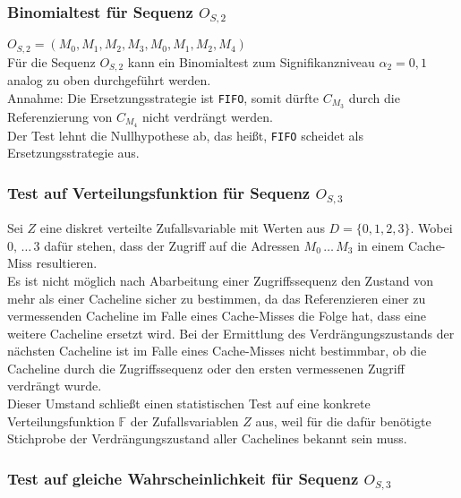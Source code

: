 \documentclass[]{scrbook}
\begin{document}
\subsubsection{Binomialtest für Sequenz $O_{S,2}$}

$O_{S,2} = (M_0 , M_1 , M_2 , M_3 , M_0 , M_1 , M_2 , M_4 )$
\\
Für die Sequenz $O_{S,2}$ kann ein Binomialtest zum Signifikanzniveau $\alpha_2 = 0,1$ analog zu oben durchgeführt werden.
\\
Annahme: Die Ersetzungsstrategie ist \texttt{FIFO}, somit dürfte $C_{M_3}$ durch die Referenzierung von $C_{M_4}$ nicht verdrängt werden.
\\
Der Test lehnt die Nullhypothese ab, das heißt, \texttt{FIFO} scheidet als Ersetzungsstrategie aus.

\subsubsection{Test auf Verteilungsfunktion für Sequenz $O_{S,3}$}

Sei $Z$ eine diskret verteilte Zufallsvariable mit Werten aus $D = \{0,1,2,3\}$. Wobei $0,\,\dots\,3$ dafür stehen, dass der Zugriff auf die Adressen $M_0\,\dots\,M_3$ in einem Cache-Miss resultieren. 
\\
Es ist nicht möglich nach Abarbeitung einer Zugriffssequenz den Zustand von mehr als einer Cacheline sicher zu bestimmen, da das Referenzieren einer zu vermessenden Cacheline im Falle eines Cache-Misses die Folge hat, dass eine weitere Cacheline ersetzt wird. 
Bei der Ermittlung des Verdrängungszustands der nächsten Cacheline ist im Falle eines Cache-Misses nicht bestimmbar, ob die Cacheline durch die Zugriffssequenz oder den ersten vermessenen Zugriff verdrängt wurde.
\\
Dieser Umstand schließt einen statistischen Test auf eine konkrete Verteilungsfunktion $\mathbb{F}$ der Zufallsvariablen $Z$ aus, weil für die dafür benötigte Stichprobe der Verdrängungszustand aller Cachelines bekannt sein muss.

\subsubsection{Test auf gleiche Wahrscheinlichkeit für Sequenz $O_{S,3}$}
\end{document}
